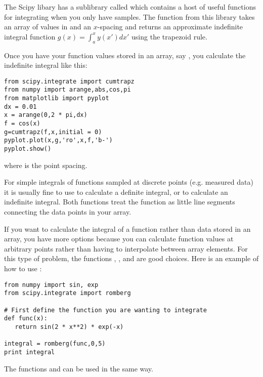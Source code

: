The Scipy libary has a sublibrary called  which
contains a host of useful functions for integrating when you only have samples.
 The  function from this library takes an array of
values in  and an $x$-spacing  and returns an approximate
indefinite integral function $g(x)=\int_a^x y(x') dx'$ using the trapezoid
rule.

Once you have your function values stored in an array, say , you calculate
the indefinite integral like this:
\begin{Verbatim}
from scipy.integrate import cumtrapz
from numpy import arange,abs,cos,pi
from matplotlib import pyplot
dx = 0.01
x = arange(0,2 * pi,dx)
f = cos(x)
g=cumtrapz(f,x,initial = 0)
pyplot.plot(x,g,'ro',x,f,'b-')
pyplot.show()
\end{Verbatim}
where  is the point spacing.



  For simple integrals of functions sampled at discrete points
(e.g. measured data) it is usually fine to use  to calculate a
definite integral, or  to calculate an indefinite integral.
Both functions treat the function as little line segments connecting the data
points in your array.

If you want to calculate the integral of a function rather than data stored
in an array, you have more options because you can calculate function values
at arbitrary points rather than having to interpolate between array elements.
For this type of problem, the functions
,
, and  are good choices.  Here is an
example of how to use :
\begin{Verbatim}
from numpy import sin, exp
from scipy.integrate import romberg

# First define the function you are wanting to integrate
def func(x):
   return sin(2 * x**2) * exp(-x)

integral = romberg(func,0,5)
print integral
\end{Verbatim}
The functions  and  can be used in the
same way.





